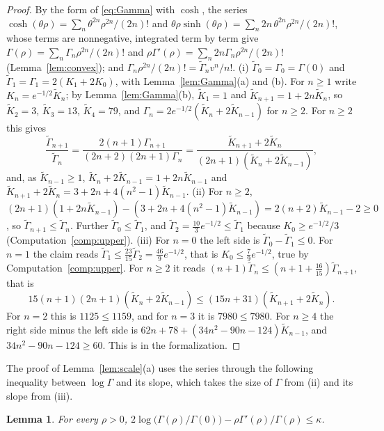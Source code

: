 \documentclass[12pt]{amsart}
\newtheorem{lemma}[theorem]{Lemma}
\theoremstyle{definition}
\numberwithin{equation}{section}
\newcommand{\leanmap}[1]{\ignorespaces}
\newcommand{\mapnote}[1]{\ignorespaces}
\begin{document}
\begin{proof}
By the form of \eqref{eq:Gamma} with $\cosh$, the series $\cosh(\theta\rho)=\sum_n\theta^{2n}\rho^{2n}/(2n)!$ and $\theta\rho\sinh(\theta\rho)=\sum_n2n\,\theta^{2n}\rho^{2n}/(2n)!$, whose terms are nonnegative, integrated term by term give $\Gamma(\rho)=\sum_n\Gamma_n\rho^{2n}/(2n)!$ and $\rho\Gamma'(\rho)=\sum_n2n\Gamma_n\rho^{2n}/(2n)!$ (Lemma~\ref{lem:convex}); and $\Gamma_n\rho^{2n}/(2n)!=\tilde\Gamma_nv^n/n!$. (i) $\tilde\Gamma_0=\Gamma_0=\Gamma(0)$ and $\tilde\Gamma_1=\Gamma_1=2(K_1+2K_0)$, with Lemma~\ref{lem:Gamma}(a) and (b). For $n\ge1$ write $K_n=e^{-1/2}\tilde K_n$; by Lemma~\ref{lem:Gamma}(b), $\tilde K_1=1$ and $\tilde K_{n+1}=1+2n\tilde K_n$, so $\tilde K_2=3$, $\tilde K_3=13$, $\tilde K_4=79$, and $\Gamma_n=2e^{-1/2}(\tilde K_n+2\tilde K_{n-1})$ for $n\ge2$. For $n\ge2$ this gives
\[
\frac{\tilde\Gamma_{n+1}}{\tilde\Gamma_n}=\frac{2(n+1)\Gamma_{n+1}}{(2n+2)(2n+1)\Gamma_n}=\frac{\tilde K_{n+1}+2\tilde K_n}{(2n+1)(\tilde K_n+2\tilde K_{n-1})},
\]
and, as $\tilde K_{n-1}\ge1$, $\tilde K_n+2\tilde K_{n-1}=1+2n\tilde K_{n-1}$ and $\tilde K_{n+1}+2\tilde K_n=3+2n+4(n^2-1)\tilde K_{n-1}$. (ii) For $n\ge2$, $(2n+1)(1+2n\tilde K_{n-1})-(3+2n+4(n^2-1)\tilde K_{n-1})=2(n+2)\tilde K_{n-1}-2\ge0$, so $\tilde\Gamma_{n+1}\le\tilde\Gamma_n$. Further $\tilde\Gamma_0\le\tilde\Gamma_1$, and $\tilde\Gamma_2=\frac{10}3e^{-1/2}\le\tilde\Gamma_1$ because $K_0\ge e^{-1/2}/3$ (Computation~\ref{comp:upper}). (iii) For $n=0$ the left side is $\tilde\Gamma_0-\tilde\Gamma_1\le0$. For $n=1$ the claim reads $\tilde\Gamma_1\le\frac{23}{15}\tilde\Gamma_2=\frac{46}9e^{-1/2}$, that is $K_0\le\frac79e^{-1/2}$, true by Computation~\ref{comp:upper}. For $n\ge2$ it reads $(n+1)\tilde\Gamma_n\le(n+1+\frac{16}{15})\tilde\Gamma_{n+1}$, that is
\[
15(n+1)(2n+1)(\tilde K_n+2\tilde K_{n-1})\le(15n+31)(\tilde K_{n+1}+2\tilde K_n).
\]
For $n=2$ this is $1125\le1159$, and for $n=3$ it is $7980\le7980$. For $n\ge4$ the right side minus the left side is $62n+78+(34n^2-90n-124)\tilde K_{n-1}$, and $34n^2-90n-124\ge60$. This is  in the formalization.
\end{proof}

The proof of Lemma~\ref{lem:scale}(a) uses the series through the following inequality between $\log\Gamma$ and its slope, which takes the size of $\Gamma$ from (ii) and its slope from (iii).

\begin{lemma}\label{lem:P}
\leanmap{RegretKappa.UnknownBT.UB.G0_le, RegretKappa.UnknownBT.UB.hasSum_le_exp,
  RegretKappa.UnknownBT.UB.shift_bound, RegretKappa.UnknownBT.UB.poisson_combine}
\mapnote{Lean proves it for $\Gamma/2$; both sides are unchanged.}
For every $\rho>0$, $2\log\bigl(\Gamma(\rho)/\Gamma(0)\bigr)-\rho\Gamma'(\rho)/\Gamma(\rho)\le\kappa$.
\end{lemma}
\end{document}
